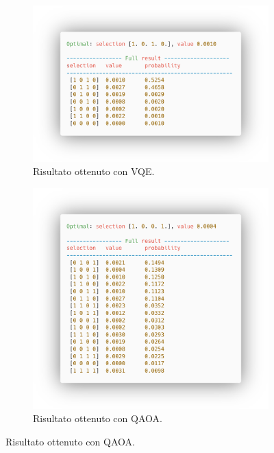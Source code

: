 \begin{figure}[h!]
    \centering
    \begin{subfigure}{0.49\textwidth}
        \centering
        \includegraphics[width=\textwidth]{images/risultatoVQE.png}
        \caption{Risultato ottenuto con VQE.}
        \label{fig:risultatoVQE}
    \end{subfigure}
    \hfill
    \begin{subfigure}{0.49\textwidth}
        \centering
        \includegraphics[width=\textwidth]{images/risultatoQAOA.png}
        \caption{Risultato ottenuto con QAOA.}
        \label{fig:risultatoQAOA}

\end{subfigure}
\end{figure}

